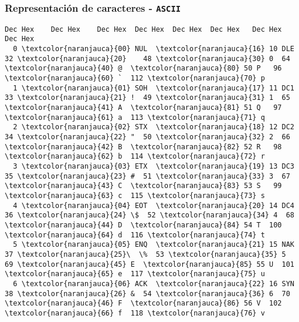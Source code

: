 \documentclass[aspectratio=169]{beamer}
\begin{document}
\begin{frame}[fragile,t]
    \frametitle{Representación de caracteres - \texttt{ASCII}}
\small
\begin{Verbatim}[commandchars=\\\{\}]
Dec Hex    Dec Hex    Dec Hex  Dec Hex  Dec Hex  Dec Hex   Dec Hex   Dec Hex  
  0 \textcolor{naranjauca}{00} NUL  \textcolor{naranjauca}{16} 10 DLE  32 \textcolor{naranjauca}{20}    48 \textcolor{naranjauca}{30} 0  64 \textcolor{naranjauca}{40} @  \textcolor{naranjauca}{80} 50 P   96 \textcolor{naranjauca}{60} `  112 \textcolor{naranjauca}{70} p
  1 \textcolor{naranjauca}{01} SOH  \textcolor{naranjauca}{17} 11 DC1  33 \textcolor{naranjauca}{21} !  49 \textcolor{naranjauca}{31} 1  65 \textcolor{naranjauca}{41} A  \textcolor{naranjauca}{81} 51 Q   97 \textcolor{naranjauca}{61} a  113 \textcolor{naranjauca}{71} q
  2 \textcolor{naranjauca}{02} STX  \textcolor{naranjauca}{18} 12 DC2  34 \textcolor{naranjauca}{22} "  50 \textcolor{naranjauca}{32} 2  66 \textcolor{naranjauca}{42} B  \textcolor{naranjauca}{82} 52 R   98 \textcolor{naranjauca}{62} b  114 \textcolor{naranjauca}{72} r
  3 \textcolor{naranjauca}{03} ETX  \textcolor{naranjauca}{19} 13 DC3  35 \textcolor{naranjauca}{23} #  51 \textcolor{naranjauca}{33} 3  67 \textcolor{naranjauca}{43} C  \textcolor{naranjauca}{83} 53 S   99 \textcolor{naranjauca}{63} c  115 \textcolor{naranjauca}{73} s
  4 \textcolor{naranjauca}{04} EOT  \textcolor{naranjauca}{20} 14 DC4  36 \textcolor{naranjauca}{24} \$  52 \textcolor{naranjauca}{34} 4  68 \textcolor{naranjauca}{44} D  \textcolor{naranjauca}{84} 54 T  100 \textcolor{naranjauca}{64} d  116 \textcolor{naranjauca}{74} t
  5 \textcolor{naranjauca}{05} ENQ  \textcolor{naranjauca}{21} 15 NAK  37 \textcolor{naranjauca}{25}\  \%  53 \textcolor{naranjauca}{35} 5  69 \textcolor{naranjauca}{45} E  \textcolor{naranjauca}{85} 55 U  101 \textcolor{naranjauca}{65} e  117 \textcolor{naranjauca}{75} u
  6 \textcolor{naranjauca}{06} ACK  \textcolor{naranjauca}{22} 16 SYN  38 \textcolor{naranjauca}{26} &  54 \textcolor{naranjauca}{36} 6  70 \textcolor{naranjauca}{46} F  \textcolor{naranjauca}{86} 56 V  102 \textcolor{naranjauca}{66} f  118 \textcolor{naranjauca}{76} v

\end{Verbatim}
\end{frame}
\end{document}
